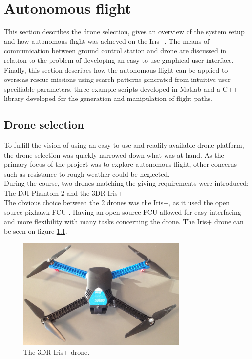 \chapter{Autonomous flight}
\label{chap:autonomousflight}
This section describes the drone selection, gives an overview of the system setup
and how autonomous flight was achieved on the Iris+.
The means of communication between ground control station and drone are discussed in relation
to the problem of developing an easy to use graphical user interface.
Finally, this section describes how the autonomous flight can be applied to overseas rescue
missions using search patterns generated from intuitive user-specifiable parameters,
three example scripts developed in Matlab and a C++ library developed for the generation and manipulation of flight paths.

\section{Drone selection}
\label{sec:droneselection}
To fulfill the vision of using an easy to use and readily available drone platform,
the drone selection was quickly narrowed down what was at hand. As the primary focus of the project was to
explore autonomous flight, other concerns such as resistance to rough weather could be neglected.
\\During the course, two drones matching the giving requirements were introduced: The DJI Phantom 2
\cite{Ref:dji} and the 3DR Iris+ \cite{Ref:3dr}.\\
The obvious choice between the 2 drones was the Iris+, as it used the open source pixhawk FCU
\cite{Ref:px4}. Having an open source FCU allowed for easy interfacing and more flexibility with
many tasks concerning the drone. The Iris+ drone can be seen on figure \ref{fig:iris}.
\\

\begin{figure}[H]
  \centering
    \includegraphics[width=0.75\textwidth]{./Images/iris}
  \caption{The 3DR Iris+ drone.}
  \label{fig:iris}
\end{figure}

